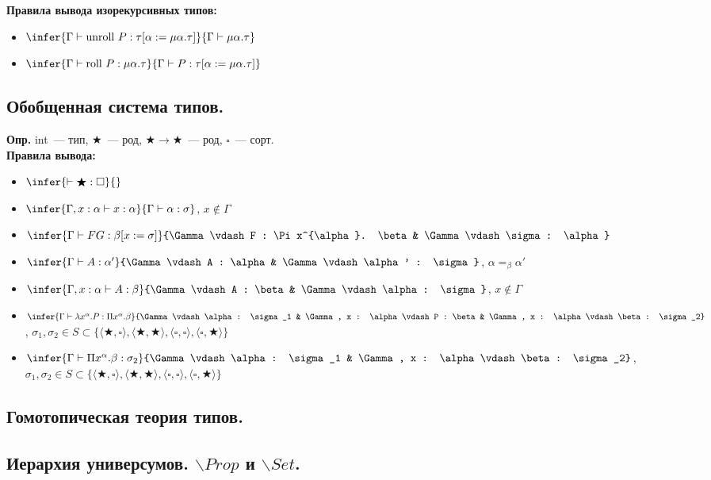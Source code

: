 \documentclass[12pt]{article}
\begin{document}
	\textbf{Правила вывода изорекурсивных типов:}
	\begin{itemize}
		\item $\infer{\Gamma \vdash \text{unroll } P : \tau [\alpha := \mu \alpha. \tau]}{\Gamma \vdash \mu \alpha. \tau}$
		\item $\infer{\Gamma \vdash \text{roll } P : \mu \alpha. \tau}{\Gamma \vdash P : \tau [\alpha := \mu \alpha. \tau]}$
	\end{itemize}
	\subsection{Обобщенная система типов.}
	\textbf{Опр.} int~--- тип, $\bigstar$~--- род, $\bigstar \rightarrow \bigstar$~--- род, $\square$~--- сорт. \\
	\textbf{Правила вывода:}
	\begin{itemize}
		\item $\infer{\vdash \bigstar : \square}{}$
		\item $\infer{\Gamma, x : \alpha \vdash x : \alpha}{\Gamma \vdash \alpha : \sigma}$, $x \not\in \Gamma$
		\item $\infer{\Gamma \vdash FG : \beta [x := \sigma]}{\Gamma \vdash F : \Pi x^{\alpha}. \beta & \Gamma \vdash \sigma : \alpha}$
		\item $\infer{\Gamma \vdash A : \alpha'}{\Gamma \vdash A : \alpha & \Gamma \vdash \alpha' : \sigma}$, $\alpha =_{\beta} \alpha'$
		\item $\infer{\Gamma, x : \alpha \vdash A : \beta}{\Gamma \vdash A : \beta & \Gamma \vdash \alpha : \sigma}$, $x \not\in \Gamma$
		\item $\infer{\Gamma \vdash \lambda x^{\alpha}. P : \Pi x^{\alpha}. \beta}{\Gamma \vdash \alpha : \sigma_1 & \Gamma, x : \alpha \vdash P : \beta & \Gamma, x : \alpha \vdash \beta : \sigma_2}$, $\sigma_1, \sigma_2 \in S \subset \{ \langle \bigstar, \square \rangle, \langle \bigstar, \bigstar \rangle, \langle \square, \square \rangle, \langle \square, \bigstar \rangle \}$
		\item $\infer{\Gamma \vdash \Pi x^{\alpha}. \beta : \sigma_2}{\Gamma \vdash \alpha : \sigma_1 & \Gamma, x : \alpha \vdash \beta : \sigma_2}$, $\sigma_1, \sigma_2 \in S \subset \{ \langle \bigstar, \square \rangle, \langle \bigstar, \bigstar \rangle, \langle \square, \square \rangle, \langle \square, \bigstar \rangle \}$
	\end{itemize}
	\subsection{Гомотопическая теория типов.}
	\subsection{Иерархия универсумов. $\backslash Prop$ и $\backslash Set$.}
\end{document}
